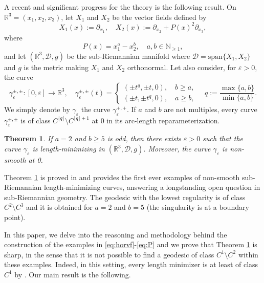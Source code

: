 \documentclass[12pt]{amsart}
\theoremstyle{plain}
\newtheorem {theorem}{Theorem}[section]
\theoremstyle{definition}
\theoremstyle{remark}
\numberwithin{equation}{section}
\newcommand{\R}{\mathbb{R}}
\newcommand{\N}{\mathbb{N}}
\newcommand{\D}{\mathcal{D}}
\newcommand{\<}{\langle}
\renewcommand{\>}{\rangle}
\newcommand{\e}{\varepsilon}
\newcommand{\0}{\theta}
\renewcommand{\d}{\partial}
\newcommand{\g}{\gamma}
\newcommand{\1}{{-1}}
\newcommand{\vspan}{\mathrm{span}}
\renewcommand{\=}{\coloneqq}
\renewcommand{\.}{\dots}
\renewcommand{\-}{\cdot}
\renewcommand{\:}{\,:\,}
\theoremstyle{definition}
\begin{document}
A recent and significant progress for the theory is the following result. On $\R^3=(x_1,x_2,x_3)$, let $X_1$ and $X_2$ be the vector fields defined by
\begin{equation}
	\label{eq:horvf}
	X_1(x):=\d_{x_1}, \quad 
	X_2(x):=\d_{x_2} + P(x)^2\d_{x_3},
\end{equation}
where 
\begin{equation}
	\label{eq:P}
	P(x)=x_1^a-x_2^b, \quad a,b\in\N_{\geq1},
\end{equation}
and let $(\R^3,\D,g)$ be the sub-Riemannian manifold where $\D=\vspan\{X_1,X_2\}$ and $g$ is the metric making $X_1$ and $X_2$ orthonormal. Let also consider, for $\e>0$, the curve
\begin{equation}
	\label{eq:gammaintro}
	 \g_\e^{\pm,\pm}:[0,\e]\to\R^3, \quad 
	 \g_\e^{\pm,\pm}(t)=
	 \begin{cases}
	 	(\pm t^{q},\pm t,0), \quad b\geq a,\\
	 	(\pm t,\pm t^{q}, 0), \quad a\geq b,
	 \end{cases}
	 \quad q:=\frac{\max\{a,b\}}{\min\{a,b\}}.
\end{equation}
We simply denote by $\g_\e$ the curve $\g_\e^{+,+}$. If $a$ and $b$ are not multiples, every curve $\g_\e^{\pm,\pm}$ is of class $C^{\lfloor q\rfloor}\setminus C^{\lfloor q\rfloor+1}$ at $0$ in its arc-length reparameterization.


\begin{theorem}
	\label{thm:main1}
	If $a=2$ and $b\geq5$ is odd, then there exists $\e>0$ such that the curve $\g_\e$ is length-minimizing in $(\R^3,\D,g)$. Moreover, the curve $\g_\e$ is non-smooth at 0.
\end{theorem}

Theorem \ref{thm:main1} is proved in \cite{CJMRSSS24} and provides the first ever examples of non-smooth sub-Riemannian length-minimizing curves, answering a longstanding open question in sub-Riemannian geometry. The geodesic with the lowest regularity is of class $C^2\setminus C^3$ and it is obtained for $a=2$ and $b=5$ (the singularity is at a boundary point).

In this paper, we delve into the reasoning and methodology behind the construction of the examples in \eqref{eq:horvf}-\eqref{eq:P} and we prove that Theorem \ref{thm:main1} is sharp, in the sense that it is not possible to find a geodesic of class $C^1\setminus C^2$ within these examples. Indeed, in this setting, every length minimizer is at least of class $C^1$ by \cite[Section 4]{LPS24}. Our main result is the following.
\end{document}
